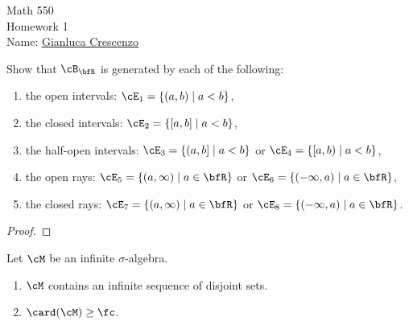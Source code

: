 \documentclass[10pt,twoside,openany]{memoir}
\begin{document}
\begin{center}
    {\Large Math 550 \\[0.1in]Homework 1}\\[.175in]
    {Name:} {\underline{Gianluca Crescenzo\hspace*{2in}}}\\[0.15in]
    \end{center}
    \vspace{4pt}
\begin{exercise}
    Show that $\cB_\bfR$ is generated by each of the following:
        \begin{enumerate}[label = \alph*.,itemsep=1pt,topsep=3pt]
            \item the open intervals: $\cE_1 = \{(a,b) \mid a < b\}$,
            \item the closed intervals: $\cE_2 = \{[a,b] \mid a < b\}$,
            \item the half-open intervals: $\cE_3 = \{(a,b] \mid a < b\}$ or $\cE_4 = \{[a,b) \mid a < b\}$,
            \item the open rays: $\cE_5 = \{(a,\infty) \mid a \in \bfR\}$ or $\cE_6 = \{(-\infty,a) \mid a \in \bfR\}$,
            \item the closed rays: $\cE_7 = \{(a,\infty) \mid a \in \bfR\}$ or $\cE_8 = \{(-\infty,a) \mid a \in \bfR\}$.
        \end{enumerate}
\end{exercise}
    {\color{blue} \begin{proof}
    
    \end{proof}}
\begin{exercise}
    Let $\cM$ be an infinite $\sigma$-algebra.
        \begin{enumerate}[label = \alph*.,itemsep=1pt,topsep=3pt]
            \item $\cM$ contains an infinite sequence of disjoint sets.
            \item $\card(\cM) \geq \fc$.
        \end{enumerate}
\end{exercise}
\end{document}
